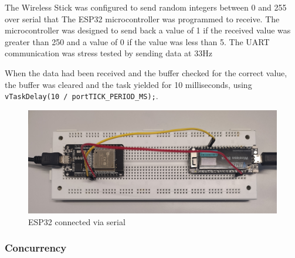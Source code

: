 The Wireless Stick was configured to send random integers between 0 and 255 over serial that The ESP32 microcontroller was programmed to receive. The microcontroller was designed to send back a value of 1 if the received value was greater than 250 and a value of 0 if the value was less than 5. The UART communication was stress tested by sending data at 33Hz

When the data had been received and the buffer checked for the correct value, the buffer was cleared and the task yielded for 10 milliseconds, using \texttt{vTaskDelay(10 / portTICK\_PERIOD\_MS);}.

\begin{figure}[ht]
  \centering
  \includegraphics[width=0.8\linewidth]{figures/serial_connection.jpg}
  \caption{ESP32 connected via serial}
  \label{fig:serial_connection}
\end{figure}

\subsubsection{Concurrency}

